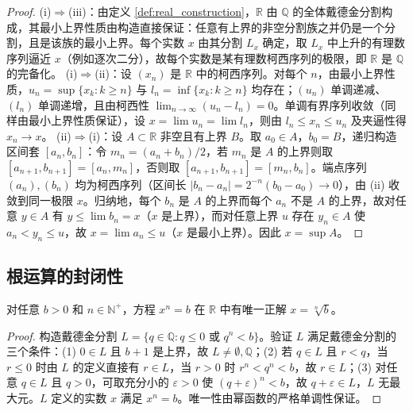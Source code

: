 \begin{proof}
(i)$\Rightarrow$(iii)：由定义 \ref{def:real_construction}，$\mathbb{R}$ 由 $\mathbb{Q}$ 的全体戴德金分割构成，其最小上界性质由构造直接保证：任意有上界的非空分割族之并仍是一个分割，且是该族的最小上界。每个实数 $x$ 由其分割 $L_x$ 确定，取 $L_x$ 中上升的有理数序列逼近 $x$（例如逐次二分），故每个实数是某有理数柯西序列的极限，即 $\mathbb{R}$ 是 $\mathbb{Q}$ 的完备化。
(i)$\Rightarrow$(ii)：设 $(x_n)$ 是 $\mathbb{R}$ 中的柯西序列。对每个 $n$，由最小上界性质，$u_n = \sup\{x_k : k \ge n\}$ 与 $l_n = \inf\{x_k : k \ge n\}$ 均存在；$(u_n)$ 单调递减、$(l_n)$ 单调递增，且由柯西性 $\lim_{n\to\infty}(u_n - l_n) = 0$。单调有界序列收敛（同样由最小上界性质保证），设 $x = \lim u_n = \lim l_n$，则由 $l_n \le x_n \le u_n$ 及夹逼性得 $x_n \to x$。
(ii)$\Rightarrow$(i)：设 $A \subset \mathbb{R}$ 非空且有上界 $B$。取 $a_0 \in A$，$b_0 = B$，递归构造区间套 $[a_n, b_n]$：令 $m_n = (a_n+b_n)/2$，若 $m_n$ 是 $A$ 的上界则取 $[a_{n+1}, b_{n+1}] = [a_n, m_n]$，否则取 $[a_{n+1}, b_{n+1}] = [m_n, b_n]$。端点序列 $(a_n),(b_n)$ 均为柯西序列（区间长 $|b_n - a_n| = 2^{-n}(b_0 - a_0) \to 0$），由 (ii) 收敛到同一极限 $x$。归纳地，每个 $b_n$ 是 $A$ 的上界而每个 $a_n$ 不是 $A$ 的上界，故对任意 $y \in A$ 有 $y \le \lim b_n = x$（$x$ 是上界），而对任意上界 $u$ 存在 $y_n \in A$ 使 $a_n < y_n \le u$，故 $x = \lim a_n \le u$（$x$ 是最小上界）。因此 $x = \sup A$。
\end{proof}

\subsection{\texorpdfstring{根运算的封闭性}{根运算的封闭性}}

\begin{theorem}[实数完备性使根运算封闭]\label{thm:real_root_closure}
对任意 $b > 0$ 和 $n \in \mathbb{N}^+$，方程 $x^n = b$ 在 $\mathbb{R}$ 中有唯一正解 $x = \sqrt[n]{b}$。
\end{theorem}

\begin{proof}
构造戴德金分割 $L = \{q \in \mathbb{Q} : q \le 0 \text{ 或 } q^n < b\}$。验证 $L$ 满足戴德金分割的三个条件：(1) $0 \in L$ 且 $b+1$ 是上界，故 $L \neq \emptyset, \mathbb{Q}$；(2) 若 $q \in L$ 且 $r < q$，当 $r\le0$ 时由 $L$ 的定义直接有 $r\in L$，当 $r > 0$ 时 $r^n < q^n < b$，故 $r \in L$；(3) 对任意 $q \in L$ 且 $q > 0$，可取充分小的 $\varepsilon > 0$ 使 $(q+\varepsilon)^n < b$，故 $q+\varepsilon \in L$，$L$ 无最大元。$L$ 定义的实数 $x$ 满足 $x^n = b$。唯一性由幂函数的严格单调性保证。
\end{proof}

